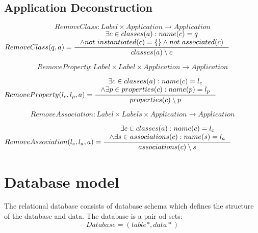 \documentclass[11pt]{article}
\begin{document}
\subsection{Application Deconstruction}
$$RemoveClass: Label \times Application \rightarrow Application $$
$
RemoveClass(q, a) = \inference{\exists c \in classes(a) : name(c) = q \\
\wedge not$ $instantiated(c) = \{ \} \wedge not$ $associated(c)}{classes(a) \setminus c }
$

$$RemoveProperty: Label \times Label \times Application \rightarrow Application $$

$
RemoveProperty(l_c, l_p, a) = \inference{\exists c \in classes(a) : name(c) = l_c \\ \wedge \exists p \in properties(c) : name(p) = l_p}{properties(c) \setminus p }
$

$$RemoveAssociation : Label \times Labels \times Application \rightarrow Application $$

$
RemoveAssociation(l_c, l_a, a) = \inference{\exists c \in classes(a) : name(c) = l_c \\ \wedge \exists s \in associations(c) : name(s) = l_a }{associations(c) \setminus s}
$


\section{Database model}
The relational database consists of database schema which defines the structure of the database and data. The database is a pair od sets:
$$
Database = (table*, data*)
$$
\end{document}
